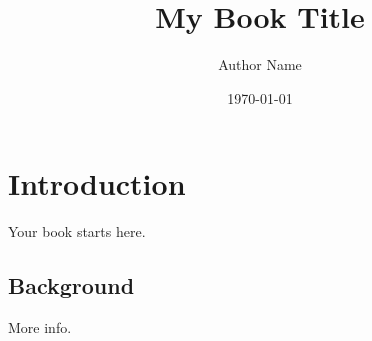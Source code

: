 \documentclass{book}
\title{My Book Title}
\author{Author Name}
\date{\today}
\begin{document}
\frontmatter             %

\maketitle

\tableofcontents         %

\mainmatter              %

\chapter{Introduction}
Your book starts here.

\section{Background}
More info.

\backmatter              %
\end{document}
